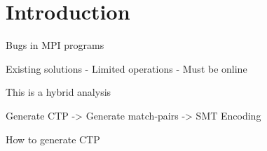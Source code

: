 \section{Introduction}

Bugs in MPI programs

Existing solutions
- Limited operations
- Must be online

This is a hybrid analysis

Generate CTP -> Generate match-pairs -> SMT Encoding

How to generate CTP

